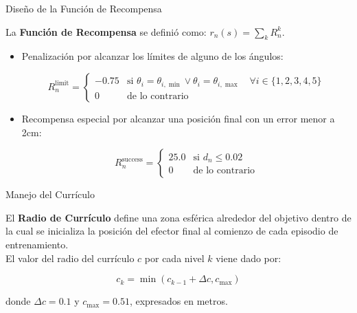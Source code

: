 \documentclass[spanish,10pt]{beamer}
\begin{document}
	\begin{frame}{Diseño de la Función de Recompensa}
		\begin{exampleblock}{}
			La \textbf{Función de Recompensa} se definió como: $r_n(s) = \sum_{k} R_n^{k}$.
			\begin{itemize}
				\item Penalización por alcanzar los límites de alguno de los ángulos:
				
				\begin{equation}
					R_{n}^{\text{limit}} =
					\begin{cases}
						-0.75 & \text{si } \theta_i = \theta_{i,\min} \lor \theta_i = \theta_{i,\max} \quad \forall i \in \{1,2,3,4,5\} \\
						0 & \text{de lo contrario}
					\end{cases}
				\end{equation}
				
				\item Recompensa especial por alcanzar una posición final con un error menor a 2cm:
				
				\begin{equation}
					R_{n}^{\text{success}} =
					\begin{cases}
						25.0 & \text{si } d_n \leq 0.02 \\
						0 & \text{de lo contrario}
					\end{cases}
				\end{equation}
				
			\end{itemize}
		\end{exampleblock}
	\end{frame}
	
	\begin{frame}{Manejo del Currículo}
		
		\begin{exampleblock}{}
			El \textbf{Radio de Currículo} define una zona esférica alrededor del objetivo dentro de la cual se inicializa la posición del efector final al comienzo de cada episodio de entrenamiento.\\[2em] 

			El valor del radio del currículo $c$ por cada nivel $k$ viene dado por:
			
			$$
			c_k = \min(c_{k-1}+\Delta c, c_{\max})
			$$
			
			donde $\Delta c = 0.1$ y $c_{\max} = 0.51$, expresados en metros.
		\end{exampleblock}
	\end{frame}
	
\end{document}
